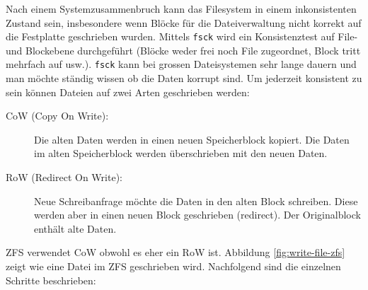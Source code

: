 Nach einem Systemzusammenbruch kann das Filesystem in einem inkonsistenten Zustand sein, insbesondere wenn Blöcke für die Dateiverwaltung nicht korrekt auf die Festplatte geschrieben wurden. Mittels \texttt{fsck} wird ein Konsistenztest auf File- und Blockebene durchgeführt (Blöcke weder frei noch File zugeordnet, Block tritt mehrfach auf usw.). \texttt{fsck} kann bei grossen Dateisystemen sehr lange dauern und man möchte ständig wissen ob die Daten korrupt sind. Um jederzeit konsistent zu sein können Dateien auf zwei Arten geschrieben werden:
\begin{description}
	\item[CoW (Copy On Write):] Die alten Daten werden in einen neuen Speicherblock kopiert. Die Daten im alten Speicherblock werden überschrieben mit den neuen Daten.
	\item[RoW (Redirect On Write):] Neue Schreibanfrage möchte die Daten in den alten Block schreiben. Diese werden aber in einen neuen Block geschrieben (redirect). Der Originalblock enthält alte Daten.
\end{description}
ZFS verwendet CoW obwohl es eher ein RoW ist. Abbildung \ref{fig:write-file-zfs} zeigt wie eine Datei im ZFS geschrieben wird. Nachfolgend sind die einzelnen Schritte beschrieben:
